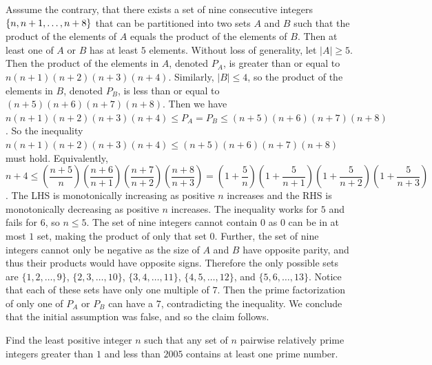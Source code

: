 \begin{solution}
Asssume the contrary, that there exists a set of nine consecutive integers $\newline\{n, n+1, \ldots, n+8\}$ that can be partitioned into two sets $A$ and $B$ such that the product of the elements of $A$ equals the product of the elements of $B$.
Then at least one of $A$ or $B$ has at least $5$ elements. Without loss of generality, let $|A| \geq 5$.
Then the product of the elements in $A$, denoted $P_A$, is greater than or equal to $n(n+1)(n+2)(n+3)(n+4)$. Similarly, $|B| \leq 4$, so
the product of the elements in $B$, denoted $P_B$, is less than or equal to $(n+5)(n+6)(n+7)(n+8)$. Then we have
$n(n+1)(n+2)(n+3)(n+4) \leq P_A = P_B \leq (n+5)(n+6)(n+7)(n+8)$. So the inequality $n(n+1)(n+2)(n+3)(n+4) \leq (n+5)(n+6)(n+7)(n+8)$ must hold.
Equivalently, $n+4 \leq \left( \dfrac{n+5}{n} \right)\left( \dfrac{n+6}{n+1} \right)\left( \dfrac{n+7}{n+2} \right)\left( \dfrac{n+8}{n+3} \right)
= \left( 1 + \dfrac{5}{n} \right) \left( 1 + \dfrac{5}{n+1} \right) \left( 1 + \dfrac{5}{n+2} \right) \left( 1 + \dfrac{5}{n+3} \right)$.
The LHS is monotonically increasing as positive $n$ increases and the RHS is monotonically decreasing as positive $n$ increases.
The inequality works for $5$ and fails for $6$, so $n \leq 5$. The set of nine integers cannot contain $0$ as $0$ can be in at most
$1$ set, making the product of only that set $0$. Further, the set of nine integers cannot only be negative as the size of $A$ and $B$ have opposite parity, and thus
their products would have opposite signs. Therefore the only possible sets are $\{ 1, 2, \dots, 9 \}$, $\{ 2, 3, \dots, 10 \}$, 
$\{ 3, 4, \dots, 11 \}$, $\{ 4, 5, \dots, 12 \}$, and $\{ 5, 6, \dots, 13 \}$. Notice that each of these sets have only one multiple of $7$. 
Then the prime factorization of only one of $P_A$ or $P_B$ can have a $7$, contradicting the inequality. We conclude that the initial assumption was false, and so the claim follows.
\end{solution}

\begin{problem}
    Find the least positive integer $n$ such that any set of $n$ pairwise relatively prime integers greater than $1$ and less than $2005$ contains at least one prime number.
\end{problem}

